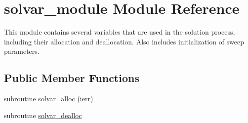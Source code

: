 \hypertarget{classsolvar__module}{\section{solvar\-\_\-module Module Reference}
\label{classsolvar__module}
}


This module contains several variables that are used in the solution process, including their allocation and deallocation. Also includes initialization of sweep parameters.  


\subsection*{Public Member Functions}
\begin{DoxyCompactItemize}
\item 
subroutine \hyperlink{classsolvar__module_ac08a83960ee881de58d34efb24831a6c}{solvar\-\_\-alloc} (ierr)
\item 
subroutine \hyperlink{classsolvar__module_a82566cdad67c6fc8e9bc443020b1a825}{solvar\-\_\-dealloc}
\end{DoxyCompactItemize}
